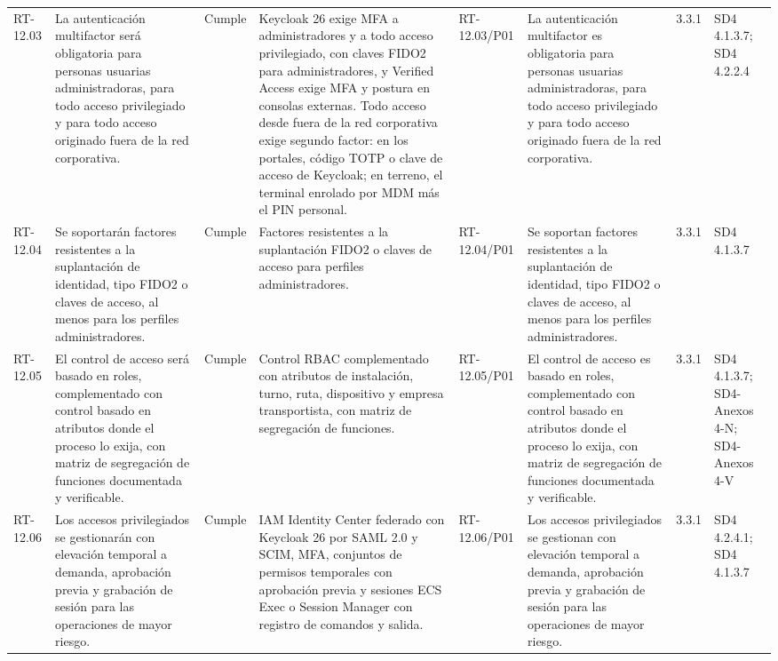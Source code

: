 \documentclass[oficio,firma,final]{lafrox}
\begin{document}
\begin{landscape}
{\begin{longtable}{@{}F{0.054} F{0.173} F{0.061} F{0.191} F{0.106} F{0.180} F{0.067} F{0.168}@{}}
  RT-12.03 & La autenticación multifactor será obligatoria para personas usuarias administradoras, para todo acceso privilegiado y para todo acceso originado fuera de la red corporativa. & Cumple & Keycloak 26 exige MFA a administradores y a todo acceso privilegiado, con claves FIDO2 para administradores, y Verified Access exige MFA y postura en consolas externas. Todo acceso desde fuera de la red corporativa exige segundo factor: en los portales, código TOTP o clave de acceso de Keycloak; en terreno, el terminal enrolado por MDM más el PIN personal. & RT-12.03/\allowbreak{}P01 & La autenticación multifactor es obligatoria para personas usuarias administradoras, para todo acceso privilegiado y para todo acceso originado fuera de la red corporativa. & 3.3.1 & SD4 4.1.3.7; SD4 4.2.2.4  \\
  RT-12.04 & Se soportarán factores resistentes a la suplantación de identidad, tipo FIDO2 o claves de acceso, al menos para los perfiles administradores. & Cumple & Factores resistentes a la suplantación FIDO2 o claves de acceso para perfiles administradores. & RT-12.04/\allowbreak{}P01 & Se soportan factores resistentes a la suplantación de identidad, tipo FIDO2 o claves de acceso, al menos para los perfiles administradores. & 3.3.1 & SD4 4.1.3.7  \\
  RT-12.05 & El control de acceso será basado en roles, complementado con control basado en atributos donde el proceso lo exija, con matriz de segregación de funciones documentada y verificable. & Cumple & Control RBAC complementado con atributos de instalación, turno, ruta, dispositivo y empresa transportista, con matriz de segregación de funciones. & RT-12.05/\allowbreak{}P01 & El control de acceso es basado en roles, complementado con control basado en atributos donde el proceso lo exija, con matriz de segregación de funciones documentada y verificable. & 3.3.1 & SD4 4.1.3.7; SD4-Anexos 4-N; SD4-Anexos 4-V  \\
  RT-12.06 & Los accesos privilegiados se gestionarán con elevación temporal a demanda, aprobación previa y grabación de sesión para las operaciones de mayor riesgo. & Cumple & IAM Identity Center federado con Keycloak 26 por SAML 2.0 y SCIM, MFA, conjuntos de permisos temporales con aprobación previa y sesiones ECS Exec o Session Manager con registro de comandos y salida. & RT-12.06/\allowbreak{}P01 & Los accesos privilegiados se gestionan con elevación temporal a demanda, aprobación previa y grabación de sesión para las operaciones de mayor riesgo. & 3.3.1 & SD4 4.2.4.1; SD4 4.1.3.7  \\

\end{longtable}}
\end{landscape}
\end{document}
